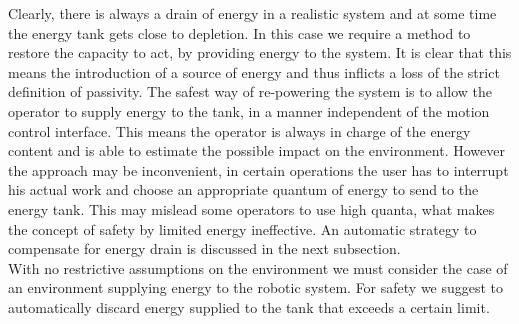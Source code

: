 \documentclass[a4paper,twoside, openright,12pt]{report}
\begin{document}
Clearly, there is always a drain of energy in a realistic system  and at some time the energy tank gets close to depletion. In this case we require a method to restore the capacity to act, by providing energy to the system. It is clear that this means the introduction of a source of energy and thus inflicts a loss of the strict definition of passivity. The safest way of re-powering the system is to allow the operator to supply energy to the tank, in a manner independent of the motion control interface. This means the operator is always in charge of the energy content and is able to estimate the possible impact on the environment. However the approach may be inconvenient, in certain operations the user has to interrupt his actual work and choose an appropriate quantum of energy to send to the energy tank. This may mislead some operators to use high quanta, what makes the concept of safety by limited energy ineffective. An automatic strategy to compensate for energy drain is discussed in the next subsection.\\
With no restrictive assumptions on the environment we must consider the case of an environment supplying energy to the robotic system. For safety we suggest to automatically discard energy supplied to the tank that exceeds a certain limit.
\end{document}
